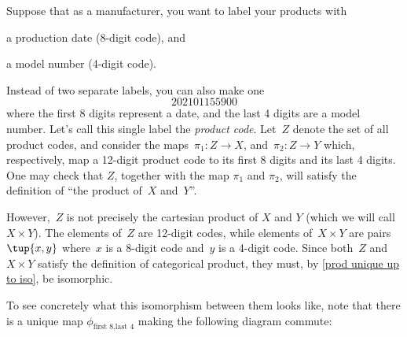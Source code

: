 
\begin{example}
    \label{ex:univ-prop-prod}
    Suppose that as a manufacturer, you want to label your products with
    \begin{compactitem}
        \item a production date (8-digit code), and
        \item a model number (4-digit code).
    \end{compactitem}
    Instead of two separate labels, you can also make one
    \begin{equation}
        \label{eq:exa-prod-univ-prop-code}
        202101155900
    \end{equation}
    where the first 8 digits represent a date, and the last 4 digits are a model number.
    Let's call this single label the \emph{product code}.
    Let~$Z$ denote the set of all product codes, and consider the maps~$\pi_1\colon Z\to X$, and~$\pi_2\colon Z\to Y$ which, respectively, map a 12-digit product code to its first 8 digits and its last 4 digits.
    One may check that $Z$, together with the map $\pi_1$ and $\pi_2$, will satisfy the definition of ``the product of~$X$ and~$Y$''.
    
    \begin{center}
    \end{center}
    
    However,~$Z$ is not precisely the cartesian product of $X$ and $Y$ (which we will call $X\times Y$).
    The elements of~$Z$ are 12-digit codes, while elements of~$X\times Y$ are pairs~$\tup{x,y}$ where~$x$ is a 8-digit code and~$y$ is a 4-digit code.
    Since both~$Z$ and~$X\times Y$ satisfy the definition of categorical product, they must, by \cref{prod unique up to iso}, be isomorphic.
    
    \begin{center}
    \end{center}
    
    To see concretely what this isomorphism between them looks like, note that there is a unique map $\phi_{\text{first 8},\text{last 4}}$ making the following diagram commute:
    
    \begin{center}
    \end{center}
    

\end{example}
